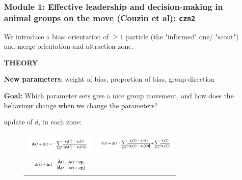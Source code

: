 \documentclass[compress]{beamer}
\begin{document}

\begin{frame}
  \frametitle{Module 1: Effective leadership and decision-making in animal groups on the move (Couzin et al): \texttt{czn2}}
  
  We introduce a bias: orientation of \( \geq 1 \) particle (the "informed" one/ "scout") and merge orientation and attraction zone.
  
  
  \hspace{1cm}
  
 
 \textbf{THEORY} 
 
 \hspace{1cm}
 
\textbf{New parameters}: weight of bias, proportion of bias, group direction

\textbf{Goal:} Which parameter sets give a nice group movement, and how does the behaviour change when we change the parameters?

\hspace{1cm}

update of \( d_{i} \) in each zone: \\
\begin{figure}
	\begin{tabular}{cc}
		\includegraphics[width=35mm]{./img/eq1.png} &   \includegraphics[width=40mm]{./img/eq2.png} \\
		\includegraphics[width=30mm]{./img/eq3.png} \\
	\end{tabular}
\end{figure}

\end{frame}


%	
%	
%	
%	
%	
\end{document}
